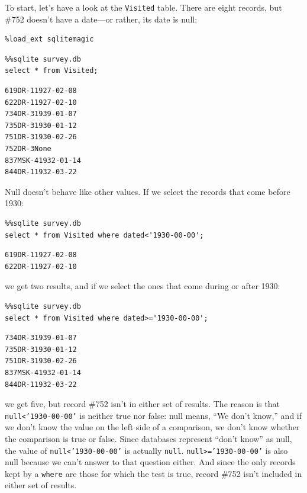 \documentclass[]{book}
\begin{document}
To start, let's have a look at the \texttt{Visited} table. There are
eight records, but \#752 doesn't have a date---or rather, its date is
null:

\begin{verbatim}
%load_ext sqlitemagic
\end{verbatim}

\begin{verbatim}
%%sqlite survey.db
select * from Visited;
\end{verbatim}

\begin{verbatim}
619DR-11927-02-08
622DR-11927-02-10
734DR-31939-01-07
735DR-31930-01-12
751DR-31930-02-26
752DR-3None
837MSK-41932-01-14
844DR-11932-03-22
\end{verbatim}

Null doesn't behave like other values. If we select the records that
come before 1930:

\begin{verbatim}
%%sqlite survey.db
select * from Visited where dated<'1930-00-00';
\end{verbatim}

\begin{verbatim}
619DR-11927-02-08
622DR-11927-02-10
\end{verbatim}

we get two results, and if we select the ones that come during or after
1930:

\begin{verbatim}
%%sqlite survey.db
select * from Visited where dated>='1930-00-00';
\end{verbatim}

\begin{verbatim}
734DR-31939-01-07
735DR-31930-01-12
751DR-31930-02-26
837MSK-41932-01-14
844DR-11932-03-22
\end{verbatim}

we get five, but record \#752 isn't in either set of results. The reason
is that \texttt{null\textless{}'1930-00-00'} is neither true nor false:
null means, ``We don't know,'' and if we don't know the value on the
left side of a comparison, we don't know whether the comparison is true
or false. Since databases represent ``don't know'' as null, the value of
\texttt{null\textless{}'1930-00-00'} is actually \texttt{null}.
\texttt{null\textgreater{}='1930-00-00'} is also null because we can't
answer to that question either. And since the only records kept by a
\texttt{where} are those for which the test is true, record \#752 isn't
included in either set of results.
\end{document}
